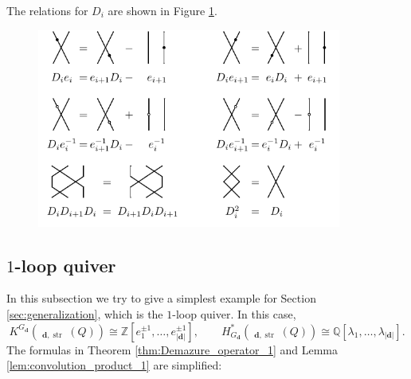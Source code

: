 \documentclass[reqno,11pt]{book}
\numberwithin{equation}{section}
\theoremstyle{plain}
\theoremstyle{plain}
\numberwithin{equation}{section}
\theoremstyle{remark}
\DeclareMathOperator{\RRep}{\widetilde{\operatorname{Rep}}}
\DeclareMathOperator{\str}{\operatorname{str}}
\newcommand{\dimvec}[1]{\mathbf{#1}}
\newcommand{\abdimvec}[1]{|\dimvec{#1}|}
\begin{document}
The relations for $D_i$ are shown in Figure \ref{fig:relations_2}.
\begin{figure}[ht]
  \vspace{0cm}
    \centering  
    \includegraphics[width=10cm]{figures/strands/relations_1.pdf}
    \caption{}
      \label{fig:relations_2}        
\end{figure}
\subsection{$1$-loop quiver}
In this subsection we try to give a simplest example for Section \ref{sec:generalization}, which is the $1$-loop quiver. In this case,
$$K^{G_{\dimvec{d}}} \left(\RRep_{\dimvec{d},\str}(Q)\right) \cong  \mathbb{Z}\!\left[ e_1^{\pm 1},\ldots,e_{\abdimvec{d}}^{\pm 1} \right], \qquad H_{G_{\dimvec{d}}}^{*}\!\!\left(\RRep_{\dimvec{d},\str}(Q)\right) \cong  \mathbb{Q}\left[\lambda_1,\ldots,\lambda_{\abdimvec{d}}\right].$$
The formulas in Theorem \ref{thm:Demazure_operator_1} and Lemma \ref{lem:convolution_product_1} are simplified:
\end{document}
